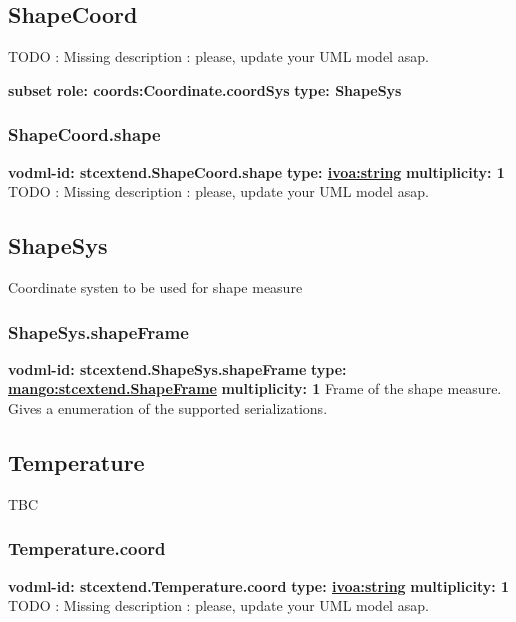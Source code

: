   \subsection{ShapeCoord}
  \label{sect:stcextend.ShapeCoord}
    TODO : Missing description : please, update your UML model asap.

    \noindent \textbf{subset} \newline
    \indent   \textbf{role: coords:Coordinate.coordSys} \newline
    \indent   \textbf{type: ShapeSys} \newline


    \subsubsection{ShapeCoord.shape}
      \textbf{vodml-id: stcextend.ShapeCoord.shape} \newline
      \textbf{type: \hyperref[sect:ivoa]{ivoa:string}} \newline
      \textbf{multiplicity: 1} \newline 
      TODO : Missing description : please, update your UML model asap.

  \subsection{ShapeSys}
  \label{sect:stcextend.ShapeSys}
    Coordinate systen to be used for shape measure

    \subsubsection{ShapeSys.shapeFrame}
      \textbf{vodml-id: stcextend.ShapeSys.shapeFrame} \newline
      \textbf{type: \hyperref[sect:stcextend.ShapeFrame]{mango:stcextend.ShapeFrame}} \newline
      \textbf{multiplicity: 1} \newline 
      Frame of the shape measure. Gives a enumeration of the supported serializations.

  \subsection{Temperature}
  \label{sect:stcextend.Temperature}
    TBC

    \subsubsection{Temperature.coord}
      \textbf{vodml-id: stcextend.Temperature.coord} \newline
      \textbf{type: \hyperref[sect:ivoa]{ivoa:string}} \newline
      \textbf{multiplicity: 1} \newline 
      TODO : Missing description : please, update your UML model asap.

